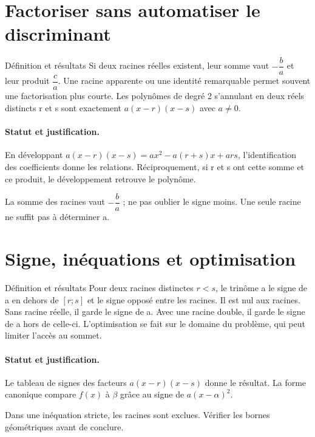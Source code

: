 \section{Factoriser sans automatiser le discriminant}\label{C02-U3}
\begin{repere}{Définition et résultats}
Si deux racines réelles existent, leur somme vaut $-\dfrac{b}{a}$ et leur produit $\dfrac{c}{a}$. Une racine apparente ou une identité remarquable permet souvent une factorisation plus courte. Les polynômes de degré 2 s’annulant en deux réels distincts r et s sont exactement $a(x-r)(x-s)$ avec $a\ne0$.
\end{repere}
\paragraph{Statut et justification.} En développant $a(x-r)(x-s)=ax^2-a(r+s)x+ars$, l’identification des coefficients donne les relations. Réciproquement, si r et s ont cette somme et ce produit, le développement retrouve le polynôme.
\label{C02-EX3}
\begin{erreur}La somme des racines vaut $-\dfrac{b}{a}$ ; ne pas oublier le signe moins. Une seule racine ne suffit pas à déterminer a.\end{erreur}
\label{C02-AP3}
\section{Signe, inéquations et optimisation}\label{C02-U4}
\begin{repere}{Définition et résultats}
Pour deux racines distinctes $r<s$, le trinôme a le signe de a en dehors de $[r;s]$ et le signe opposé entre les racines. Il est nul aux racines. Sans racine réelle, il garde le signe de a. Avec une racine double, il garde le signe de a hors de celle-ci. L’optimisation se fait sur le domaine du problème, qui peut limiter l’accès au sommet.
\end{repere}
\paragraph{Statut et justification.} Le tableau de signes des facteurs $a(x-r)(x-s)$ donne le résultat. La forme canonique compare $f(x)$ à $\beta$ grâce au signe de $a(x-\alpha)^2$.
\label{C02-EX4}
\begin{erreur}Dans une inéquation stricte, les racines sont exclues. Vérifier les bornes géométriques avant de conclure.\end{erreur}
\label{C02-AP4}
